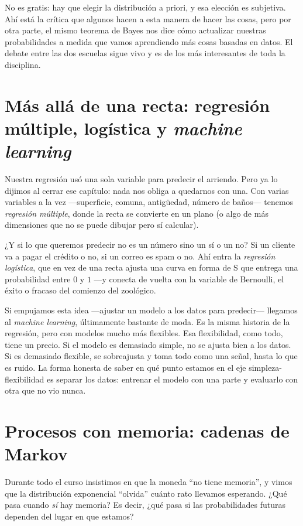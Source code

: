 No es gratis: hay que elegir la distribución a priori, y esa elección es subjetiva. Ahí está la crítica que algunos hacen a esta manera de hacer las cosas, pero por otra parte, el mismo teorema de Bayes nos dice cómo actualizar nuestras probabilidades a medida que vamos aprendiendo más cosas basadas en datos. El debate entre las dos escuelas sigue vivo y es de los más interesantes de toda la disciplina.

\section{Más allá de una recta: regresión múltiple, logística y \emph{machine learning}}

Nuestra regresión usó una sola variable para predecir el arriendo. Pero ya lo dijimos al cerrar ese capítulo: nada nos obliga a quedarnos con una. Con varias variables a la vez —superficie, comuna, antigüedad, número de baños— tenemos \emph{regresión múltiple}, donde la recta se convierte en un plano (o algo de más dimensiones que no se puede dibujar pero sí calcular).

¿Y si lo que queremos predecir no es un número sino un sí o un no? Si un cliente va a pagar el crédito o no, si un correo es spam o no. Ahí entra la \emph{regresión logística}, que en vez de una recta ajusta una curva en forma de S que entrega una probabilidad entre \(0\) y \(1\) —y conecta de vuelta con la variable de Bernoulli, el éxito o fracaso del comienzo del zoológico.

Si empujamos esta idea —ajustar un modelo a los datos para predecir— llegamos al \emph{machine learning}, últimamente bastante de moda. Es la misma historia de la regresión, pero con modelos mucho más flexibles. Esa flexibilidad, como todo, tiene un precio. Si el modelo es demasiado simple, no se ajusta bien a los datos. Si es demasiado flexible, se sobreajusta y toma todo como una señal, hasta lo que es ruido. La forma honesta de saber en qué punto estamos en el eje simpleza-flexibilidad es separar los datos: entrenar el modelo con una parte y evaluarlo con otra que no vio nunca.

\section{Procesos con memoria: cadenas de Markov}

Durante todo el curso insistimos en que la moneda \enquote{no tiene memoria}, y vimos que la distribución exponencial \enquote{olvida} cuánto rato llevamos esperando. ¿Qué pasa cuando \emph{sí} hay memoria? Es decir, ¿qué pasa si las probabilidades futuras dependen del lugar en que estamos?

